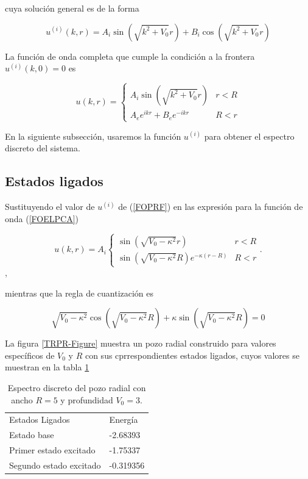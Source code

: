 cuya solución general es de la forma

\begin{equation*}
u^{(i)}(k,r) = A_i \sin(\sqrt{k^2 + V_0} r) + B_i \cos(\sqrt{k^2 + V_0} r)
\end{equation*}

La función de onda completa que cumple la condición a la frontera $u^{(i)}(k,0)=0$ es 

\begin{equation*}
u(k,r) = 
\begin{cases}
A_i \sin(\sqrt{k^2 + V_0} r) & r < R
\\
A_e e^{ikr} + B_e e^{-ikr} & R < r
\end{cases}
\label{FOPRF}
\end{equation*}

En la siguiente subsección, usaremos la función $u^{(i)}$ para obtener el espectro discreto del sistema.

\subsection{Estados ligados}

Sustituyendo el valor de $u^{(i)}$  de (\ref{FOPRF}) en las expresión para la función de onda (\ref{FOELPCA})

\begin{equation*}
u(k,r) =
A_i 
\begin{cases}
\sin(\sqrt{V_0 - \kappa^2} r) & r < R 
\\ 
\sin(\sqrt{V_0 - \kappa^2} R) e^{-\kappa (r - R)} & R < r
\end{cases}.
\end{equation*},

mientras que la regla de cuantización es

\begin{equation}
	\sqrt{V_0 - \kappa^2} \cos(\sqrt{V_0 - \kappa^2} R) + \kappa \sin(\sqrt{V_0 - \kappa^2} R) = 0
\end{equation}

La figura \ref{TRPR-Figure} muestra un pozo radial construido para valores específicos de $V_0$ y $R$ con sus cprrespondientes estados ligados, cuyos valores se muestran en la tabla \ref{TRPR-Table}

\begin{table}
	\caption{\label{TRPR-Table} Espectro discreto del pozo radial con ancho $R=5$ y profundidad $V_0 = 3$.}
	\begin{center}
		\begin{tabular}{ll}
			Estados Ligados & Energía\\
			
			Estado base &-2.68393 \\
			
			Primer estado excitado & -1.75337\\
			
			Segundo estado excitado & -0.319356\\
			
		\end{tabular}
	\end{center}
\end{table}

